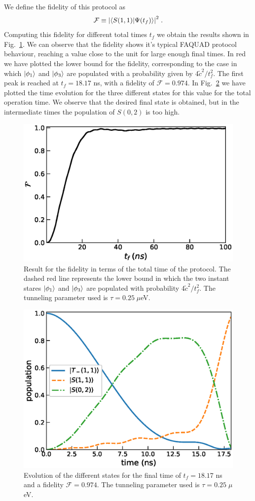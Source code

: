 \documentclass[a4paper,11pt]{article}
\begin{document}
We define the fidelity of this protocol as
\begin{equation}
	\mathcal{F}\equiv \abs{\braket{S(1,1)}{\Psi(t_f)}}^2\; .
\end{equation}
Computing this fidelity for different total times $t_f$ we obtain the results shown in Fig.~\ref{fig:FAQUAD_2QD_Results}. We can observe that the fidelity shows it's typical FAQUAD protocol behaviour, reaching a value close to the unit for large enough final times. In red we have plotted the lower bound for the fidelity, corresponding to the case in which $\ket{\phi_1}$ and $\ket{\phi_3}$ are populated with a probability given by $4\tilde{c}^2/t_f^2$. The first peak is reached at $t_f=18.17$ ns, with a fidelity of $\mathcal{F}=0.974$. In Fig.~\ref{fig:states_evolution} we have plotted the time evolution for the three different states for this value for the total operation time. We observe that the desired final state is obtained, but in the intermediate times the population of $S(0,2)$ is too high.
\begin{figure}[!htbp]
	\centering
	\includegraphics[width=0.7\linewidth]{FAQUAD_2QD_Results.eps}
	\caption{Result for the fidelity in terms of the total time of the protocol. The dashed red line represents the lower bound in which the two instant stares $\ket{\phi_1}$ and $\ket{\phi_3}$ are populated with probability $4\tilde{c}^2/t_f^2$. The tunneling parameter used is $\tau=0.25\; \mu$eV.}
	\label{fig:FAQUAD_2QD_Results}
\end{figure}

\begin{figure}[!htbp]
	\centering
	\includegraphics[width=0.7\linewidth]{states_evolution.eps}
	\caption{Evolution of the different states for the final time of $t_f=18.17$ ns and a fidelity $\mathcal{F}=0.974$. The tunneling parameter used is $\tau=0.25\; \mu$eV.}
	\label{fig:states_evolution}
\end{figure}
\end{document}
